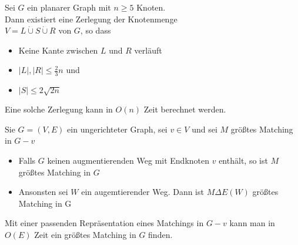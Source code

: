 \documentclass[14pt]{article}
\begin{document}
\begin{eigenschaft}
    Sei $G$ ein planarer Graph mit $n \geq 5$ Knoten. \\
    Dann existiert eine Zerlegung der Knotenmenge \\
    $V = L \dot{\cup} S \dot{\cup} R$ von $G$, so dass
    \begin{itemize}
        \item Keine Kante zwischen $L$ und $R$ verläuft
        \item $|L|, |R| \leq \frac{2}{3}n$ und
        \item $|S| \leq 2 \sqrt{2n}$
    \end{itemize}
    Eine solche Zerlegung kann in $O(n)$ Zeit berechnet werden.
\end{eigenschaft}
\begin{eigenschaft}
    Sie $G = (V, E)$ ein ungerichteter Graph, sei $v \in V$ und sei 
    $M$ größtes Matching in $G - v$
    \begin{itemize}
        \item Falls $G$ keinen augmentierenden Weg mit Endknoten $v$
        enthält, so ist $M$ größtes Matching in $G$
        \item Ansonsten sei $W$ ein augemtierender Weg. Dann ist
        $M \varDelta E(W)$ größtes Matching in G
    \end{itemize}
    Mit einer passenden Repräsentation eines Matchings in $G - v$
    kann man in $O(E)$ Zeit ein größtes Matching in $G$ finden.
\end{eigenschaft}
\end{document}
